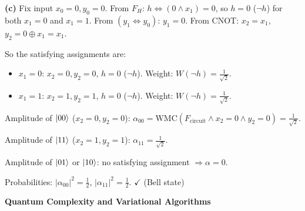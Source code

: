\documentclass[12pt,a4paper]{exam}
\begin{document}
\begin{questions}
\begin{parts}
\begin{solution}
\textbf{(c)} Fix input $x_0=0, y_0=0$.
From $F_H$: $h \Leftrightarrow (0 \land x_1)= 0$, so $h=0$ ($\neg h$) for both $x_1=0$ and $x_1=1$.
From $(y_1 \Leftrightarrow y_0)$: $y_1 = 0$.
From CNOT: $x_2=x_1$, $y_2 = 0 \oplus x_1 = x_1$.

So the satisfying assignments are:
\begin{itemize}
  \item $x_1=0$: $x_2=0, y_2=0$, $h=0$ ($\neg h$). Weight: $W(\neg h) = \frac{1}{\sqrt{2}}$.
  \item $x_1=1$: $x_2=1, y_2=1$, $h=0$ ($\neg h$). Weight: $W(\neg h) = \frac{1}{\sqrt{2}}$.
\end{itemize}

Amplitude of $\ket{00}$ ($x_2=0, y_2=0$):
$\alpha_{00} = \mathrm{WMC}(F_{\text{circuit}} \land x_2=0 \land y_2=0) = \frac{1}{\sqrt{2}}$.

Amplitude of $\ket{11}$ ($x_2=1, y_2=1$):
$\alpha_{11} = \frac{1}{\sqrt{2}}$.

Amplitude of $\ket{01}$ or $\ket{10}$: no satisfying assignment $\Rightarrow \alpha = 0$.

Probabilities: $|\alpha_{00}|^2 = \frac{1}{2}$, $|\alpha_{11}|^2 = \frac{1}{2}$. $\checkmark$ (Bell state)
\end{solution}

\end{parts}

\newpage
\question[20] \textbf{Quantum Complexity and Variational Algorithms}

\end{questions}
\end{document}

